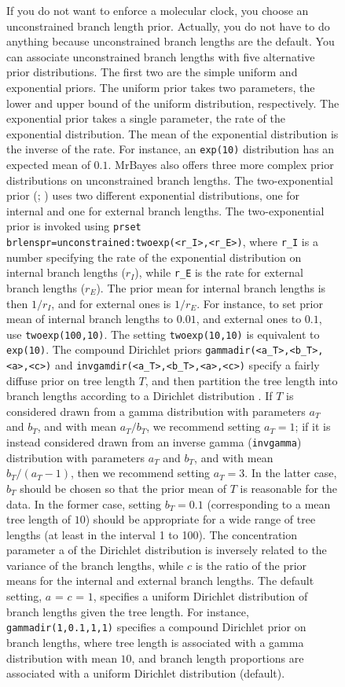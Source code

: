 \documentclass[12pt]{book}
\newcommand{\ttt}[1]{\texttt{#1}}
\begin{document}
\begin{figure}[h]
If you do not want to enforce a molecular clock, you choose an unconstrained branch length prior.
Actually, you do not have to do anything because unconstrained branch lengths are the default. You
can associate unconstrained branch lengths with five alternative prior distributions. The first two
are the simple uniform and exponential priors. The uniform prior takes two parameters, the lower
and upper bound of the uniform distribution, respectively. The exponential prior takes a single
parameter, the rate of the exponential distribution. The mean of the exponential distribution is
the inverse of the rate. For instance, an \ttt{exp(10)} distribution has an expected mean of $0.1$.
MrBayes also offers three more complex prior distributions on unconstrained branch lengths. The
two-exponential prior (\citet{yang05}; \citet{yang07}) uses two different exponential
distributions, one for internal and one for external branch lengths. The two-exponential prior is
invoked using \ttt{prset brlenspr=unconstrained:twoexp(<r\_I>,<r\_E>)}, where \ttt{r\_I} is a
number specifying the rate of the exponential distribution on internal branch lengths ($r_{I}$),
while \ttt{r\_E} is the rate for external branch lengths ($r_{E}$). The prior mean for internal
branch lengths is then $1/r_{I}$, and for external ones is $1/r_{E}$. For instance, to set prior
mean of internal branch lengths to $0.01$, and external ones to $0.1$, use \ttt{twoexp(100,10)}.
The setting \ttt{twoexp(10,10)} is equivalent to \ttt{exp(10)}. The compound Dirichlet priors
\ttt{gammadir(<a\_T>,<b\_T>,<a>,<c>)} and \ttt{invgamdir(<a\_T>,<b\_T>,<a>,<c>)} specify a fairly
diffuse prior on tree length $T$, and then partition the tree length into branch lengths according
to a Dirichlet distribution \citep{rannala12}. If $T$ is considered drawn from a gamma
distribution with parameters $a_{T}$ and $b_{T}$, and with mean $a_{T}/b_{T}$, we recommend setting
$a_{T} = 1$; if it is instead considered drawn from an inverse gamma (\ttt{invgamma}) distribution
with parameters $a_{T}$ and $b_{T}$, and with mean $b_{T}/(a_{T} - 1)$, then we recommend setting
$a_{T} = 3$. In the latter case, $b_{T}$ should be chosen so that the prior mean of $T$ is
reasonable for the data. In the former case, setting $b_{T} = 0.1$ (corresponding to a mean tree
length of $10$) should be appropriate for a wide range of tree lengths (at least in the interval 1
to 100). The concentration parameter a of the Dirichlet distribution is inversely related to the
variance of the branch lengths, while $c$ is the ratio of the prior means for the internal and
external branch lengths. The default setting, $a$ = $c$ = $1$, specifies a uniform Dirichlet
distribution of branch lengths given the tree length. For instance, \ttt{gammadir(1,0.1,1,1)}
specifies a compound Dirichlet prior on branch lengths, where tree length is associated with a
gamma distribution with mean $10$, and branch length proportions are associated with a uniform
Dirichlet distribution (default).


\end{figure}
\end{document}

